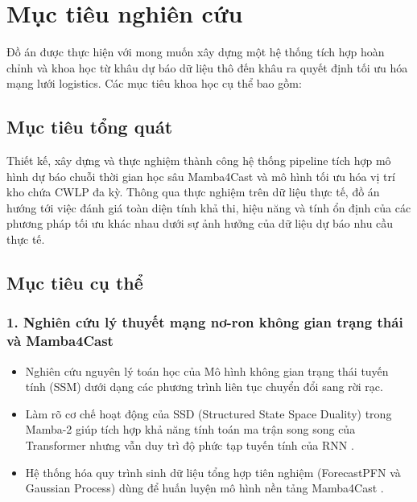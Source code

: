 \section{Mục tiêu nghiên cứu}

Đồ án được thực hiện với mong muốn xây dựng một hệ thống tích hợp hoàn chỉnh và khoa học từ khâu dự báo dữ liệu thô đến khâu ra quyết định tối ưu hóa mạng lưới logistics. Các mục tiêu khoa học cụ thể bao gồm:

\subsection{Mục tiêu tổng quát}
Thiết kế, xây dựng và thực nghiệm thành công hệ thống pipeline tích hợp mô hình dự báo chuỗi thời gian học sâu Mamba4Cast và mô hình tối ưu hóa vị trí kho chứa CWLP đa kỳ. Thông qua thực nghiệm trên dữ liệu thực tế, đồ án hướng tới việc đánh giá toàn diện tính khả thi, hiệu năng và tính ổn định của các phương pháp tối ưu khác nhau dưới sự ảnh hưởng của dữ liệu dự báo nhu cầu thực tế.

\subsection{Mục tiêu cụ thể}

\subsubsection{\large 1. Nghiên cứu lý thuyết mạng nơ-ron không gian trạng thái và Mamba4Cast}
\begin{itemize}
    \item Nghiên cứu nguyên lý toán học của Mô hình không gian trạng thái tuyến tính (SSM) dưới dạng các phương trình liên tục chuyển đổi sang rời rạc.
    \item Làm rõ cơ chế hoạt động của SSD (Structured State Space Duality) trong Mamba-2 giúp tích hợp khả năng tính toán ma trận song song của Transformer nhưng vẫn duy trì độ phức tạp tuyến tính của RNN \cite{dao2024}.
    \item Hệ thống hóa quy trình sinh dữ liệu tổng hợp tiên nghiệm (ForecastPFN và Gaussian Process) dùng để huấn luyện mô hình nền tảng Mamba4Cast \cite{bhethanabhotla2024, dooley2023}.
\end{itemize}

